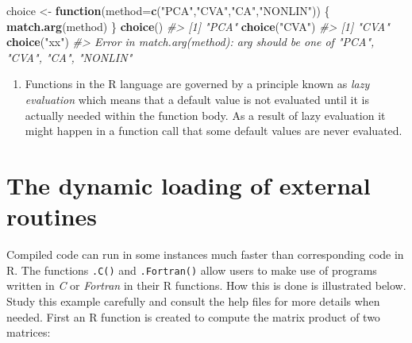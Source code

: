 \documentclass[
]{book}
\newenvironment{Shaded}{\begin{snugshade}}{\end{snugshade}}
\newcommand{\AttributeTok}[1]{\textcolor[rgb]{0.13,0.29,0.53}{#1}}
\newcommand{\CommentTok}[1]{\textcolor[rgb]{0.56,0.35,0.01}{\textit{#1}}}
\newcommand{\ControlFlowTok}[1]{\textcolor[rgb]{0.13,0.29,0.53}{\textbf{#1}}}
\newcommand{\FunctionTok}[1]{\textcolor[rgb]{0.13,0.29,0.53}{\textbf{#1}}}
\newcommand{\NormalTok}[1]{#1}
\newcommand{\OtherTok}[1]{\textcolor[rgb]{0.56,0.35,0.01}{#1}}
\newcommand{\StringTok}[1]{\textcolor[rgb]{0.31,0.60,0.02}{#1}}
\providecommand{\tightlist}{%
  \setlength{\itemsep}{0pt}\setlength{\parskip}{0pt}}
\begin{document}
\begin{Shaded}
\begin{Highlighting}[]
\NormalTok{choice }\OtherTok{\textless{}{-}} \ControlFlowTok{function}\NormalTok{(}\AttributeTok{method=}\FunctionTok{c}\NormalTok{(}\StringTok{"PCA"}\NormalTok{,}\StringTok{"CVA"}\NormalTok{,}\StringTok{"CA"}\NormalTok{,}\StringTok{"NONLIN"}\NormalTok{))}
\NormalTok{   \{ }\FunctionTok{match.arg}\NormalTok{(method)  \}}
\FunctionTok{choice}\NormalTok{()}
\CommentTok{\#\textgreater{} [1] "PCA"}
\FunctionTok{choice}\NormalTok{(}\StringTok{"CVA"}\NormalTok{)}
\CommentTok{\#\textgreater{} [1] "CVA"}
\FunctionTok{choice}\NormalTok{(}\StringTok{"xx"}\NormalTok{)}
\CommentTok{\#\textgreater{} Error in match.arg(method): \textquotesingle{}arg\textquotesingle{} should be one of "PCA", "CVA", "CA", "NONLIN"}
\end{Highlighting}
\end{Shaded}

\begin{enumerate}
\def\labelenumi{(\alph{enumi})}
\setcounter{enumi}{1}
\tightlist
\item
  Functions in the R language are governed by a principle known as \emph{{lazy evaluation}} which means that a default value is not evaluated until it is actually needed within the function body. As a result of lazy evaluation it might happen in a function call that some default values are never evaluated.
\end{enumerate}

\section{The dynamic loading of external routines}\label{the-dynamic-loading-of-external-routines}

Compiled code can run in some instances much faster than corresponding code in R. The functions \texttt{.C()} and \texttt{.Fortran()} allow users to make use of programs written in \emph{{C}} or \emph{{Fortran}} in their R functions. How this is done is illustrated below. Study this example carefully and consult the help files for more details when needed.
First an R function is created to compute the matrix product of two matrices:
\end{document}
